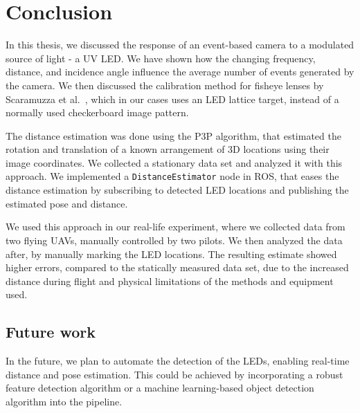 
\chapter{Conclusion\label{chap:conclusion}}
In this thesis, we discussed the response of an event-based camera to a modulated source of light - a \ac{UV} \ac{LED}.
We have shown how the changing frequency, distance, and incidence angle influence the average number of events generated
by the camera. We then discussed the calibration method for fisheye lenses by Scaramuzza et al.~\cite{scaramuzzacalibration},
which in our cases uses an \ac{LED} lattice target, instead of a normally used checkerboard image pattern.

The distance estimation was done using the \ac{P3P} algorithm, that estimated the rotation and translation of a known
arrangement of 3D locations using their image coordinates. We collected a stationary data set and analyzed it with this
approach. We implemented a \texttt{DistanceEstimator} node in \ac{ROS}, that eases the distance estimation by subscribing
to detected \ac{LED} locations and publishing the estimated pose and distance.

We used this approach in our real-life experiment, where we collected data from two flying \ac{UAV}s, manually controlled by two pilots. We then analyzed the data after, by manually marking the \ac{LED} locations. The resulting estimate showed
higher errors, compared to the statically measured data set, due to the increased distance during flight and physical
limitations of the methods and equipment used.

\section{Future work}
In the future, we plan to automate the detection of the \ac{LED}s, enabling real-time distance and pose estimation.
This could be achieved by incorporating a robust feature detection algorithm or a machine learning-based object detection
algorithm into the pipeline.
